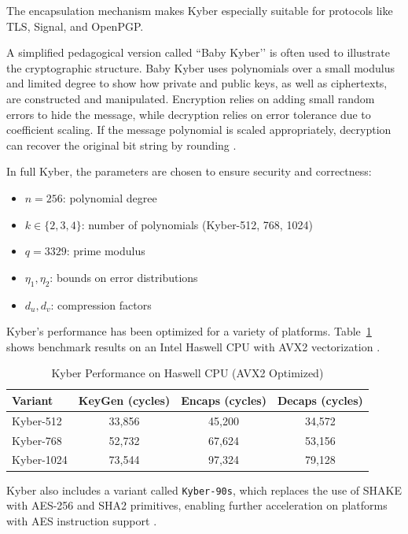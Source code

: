 The encapsulation mechanism makes Kyber especially suitable for protocols like TLS, Signal, and OpenPGP. %

A simplified pedagogical version called ``Baby Kyber’’ is often used to illustrate the cryptographic structure. Baby Kyber uses polynomials over a small modulus and limited degree to show how private and public keys, as well as ciphertexts, are constructed and manipulated. Encryption relies on adding small random errors to hide the message, while decryption relies on error tolerance due to coefficient scaling. If the message polynomial is scaled appropriately, decryption can recover the original bit string by rounding \cite{kyber2021}. %

In full Kyber, the parameters are chosen to ensure security and correctness:
\begin{itemize}
    \item $n = 256$: polynomial degree
    \item $k \in \{2, 3, 4\}$: number of polynomials (Kyber-512, 768, 1024)
    \item $q = 3329$: prime modulus
    \item $\eta_1, \eta_2$: bounds on error distributions
    \item $d_u, d_v$: compression factors
\end{itemize}

Kyber’s performance has been optimized for a variety of platforms. Table~\ref{tab:kyber_perf} shows benchmark results on an Intel Haswell CPU with AVX2 vectorization \cite{kyber2024}. %

\begin{table}[h]
\centering
\caption{Kyber Performance on Haswell CPU (AVX2 Optimized)}
\label{tab:kyber_perf}
\begin{tabular}{|l|c|c|c|}
\hline
\textbf{Variant} & \textbf{KeyGen (cycles)} & \textbf{Encaps (cycles)} & \textbf{Decaps (cycles)} \\
\hline
Kyber-512 & 33,856 & 45,200 & 34,572 \\
Kyber-768 & 52,732 & 67,624 & 53,156 \\
Kyber-1024 & 73,544 & 97,324 & 79,128 \\
\hline
\end{tabular}
\end{table}

Kyber also includes a variant called \texttt{Kyber-90s}, which replaces the use of SHAKE with AES-256 and SHA2 primitives, enabling further acceleration on platforms with AES instruction support \cite{kyber2024}. %

